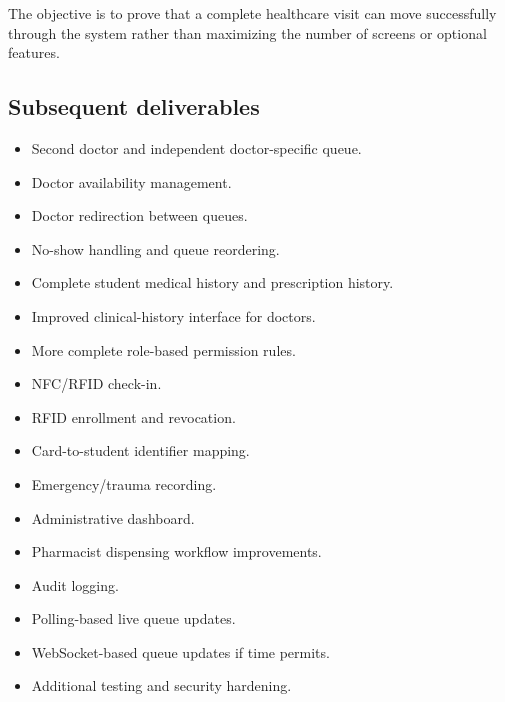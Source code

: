 \documentclass[11pt,a4paper]{article}
\begin{document}
The objective is to prove that a complete healthcare visit can move successfully through the system rather than maximizing the number of screens or optional features.

\subsection{Subsequent deliverables}

\begin{itemize}

    \item Second doctor and independent doctor-specific queue.

    \item Doctor availability management.

    \item Doctor redirection between queues.

    \item No-show handling and queue reordering.

    \item Complete student medical history and prescription history.

    \item Improved clinical-history interface for doctors.

    \item More complete role-based permission rules.

    \item NFC/RFID check-in.

    \item RFID enrollment and revocation.

    \item Card-to-student identifier mapping.

    \item Emergency/trauma recording.

    \item Administrative dashboard.

    \item Pharmacist dispensing workflow improvements.

    \item Audit logging.

    \item Polling-based live queue updates.

    \item WebSocket-based queue updates if time permits.

    \item Additional testing and security hardening.

\end{itemize}
\end{document}
